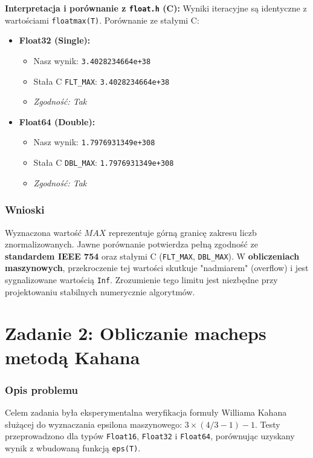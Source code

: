 \documentclass[11pt, a4paper]{article}
\begin{document}
\noindent \textbf{Interpretacja i porównanie z \texttt{float.h} (C):}
Wyniki iteracyjne są identyczne z wartościami \texttt{floatmax(T)}. Porównanie ze stałymi C:

\begin{itemize}
    \item \textbf{Float32 (Single):}
    \begin{itemize}
        \item Nasz wynik: \texttt{3.4028234664e+38}
        \item Stała C \texttt{FLT\_MAX}: \texttt{3.4028234664e+38}
        \item \textit{Zgodność: Tak}
    \end{itemize}
    \item \textbf{Float64 (Double):}
    \begin{itemize}
        \item Nasz wynik: \texttt{1.7976931349e+308}
        \item Stała C \texttt{DBL\_MAX}: \texttt{1.7976931349e+308}
        \item \textit{Zgodność: Tak}
    \end{itemize}
\end{itemize}

\subsubsection{Wnioski}
Wyznaczona wartość $MAX$ reprezentuje górną granicę zakresu liczb znormalizowanych. Jawne porównanie potwierdza pełną zgodność ze \textbf{standardem IEEE 754} oraz stałymi C (\texttt{FLT\_MAX}, \texttt{DBL\_MAX}). W \textbf{obliczeniach maszynowych}, przekroczenie tej wartości skutkuje "nadmiarem" (overflow) i jest sygnalizowane wartością \texttt{Inf}. Zrozumienie tego limitu jest niezbędne przy projektowaniu stabilnych numerycznie algorytmów.


\section{Zadanie 2: Obliczanie macheps metodą Kahana}

\subsubsection{Opis problemu}
Celem zadania była eksperymentalna weryfikacja formuły Williama Kahana służącej do wyznaczania epsilona maszynowego: $3 \times (4/3 - 1) - 1$. Testy przeprowadzono dla typów \texttt{Float16}, \texttt{Float32} i \texttt{Float64}, porównując uzyskany wynik z wbudowaną funkcją \texttt{eps(T)}.
\end{document}
